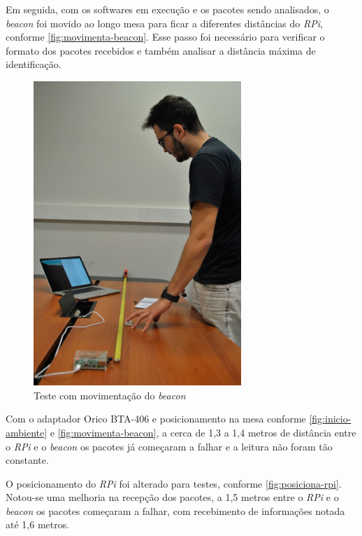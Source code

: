 \documentclass[
		12pt,				%
		openright,			%
		oneside,			%
		a4paper,			%
		chapter=TITLE,		%
		english,			%
		brazil				%
	]{abntex2}
\begin{document}
Em seguida, com os softwares em execução e os pacotes sendo analisados, o \textit{beacon} foi movido ao longo mesa para ficar a diferentes distâncias do \textit{RPi}, conforme \autoref{fig:movimenta-beacon}. Esse passo foi necessário para verificar o formato dos pacotes recebidos e também analisar a distância máxima de identificação.

\begin{figure}[htb]
	\caption{\label{fig:movimenta-beacon}Teste com movimentação do \textit{beacon}}
	\begin{center}
		\includegraphics[width=0.7\textwidth]{img/ambiente4.jpg}
	\end{center}
\end{figure}

Com o adaptador Orico BTA-406 e posicionamento na mesa conforme \autoref{fig:inicio-ambiente} e \autoref{fig:movimenta-beacon}, a cerca de 1,3 a 1,4 metros de distância entre o \textit{RPi} e o \textit{beacon} os pacotes já começaram a falhar e a leitura não foram tão constante.

O posicionamento do \textit{RPi} foi alterado para testes, conforme \autoref{fig:posiciona-rpi}. Notou-se uma melhoria na recepção dos pacotes, a 1,5 metros entre o \textit{RPi} e o \textit{beacon} os pacotes começaram a falhar, com recebimento de informações notada até 1,6 metros.
\end{document}
